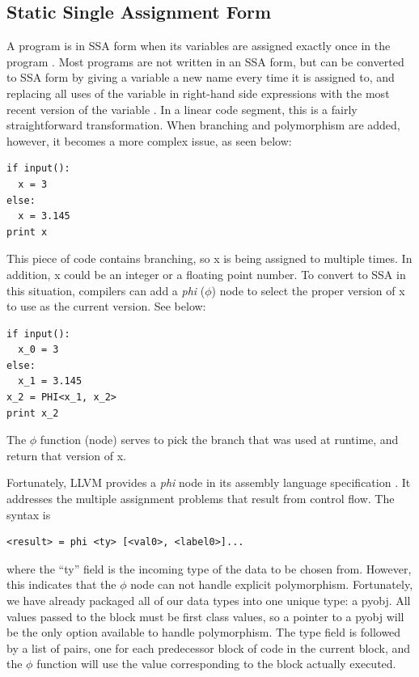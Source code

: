 \documentclass[11pt,twocolumn]{article}
\begin{document}


\subsection{Static Single Assignment Form}
\label{sec:SSAForm}

A program is in SSA form when its variables are assigned exactly once
in the program \cite{gcc-gnu.org}. Most programs are not written in an
SSA form, but can be converted to SSA form by giving a variable a new
name every time it is assigned to, and replacing all uses of the
variable in right-hand side expressions with the most recent version
of the variable \cite{brandis-mossenbock}. In a linear code segment,
this is a fairly straightforward transformation. When branching and
polymorphism are added, however, it becomes a more complex issue, as
seen below:

\begin{verbatim}
if input():
  x = 3
else:
  x = 3.145
print x
\end{verbatim}

This piece of code contains branching, so x is being assigned to
multiple times. In addition, x could be an integer or a floating point
number. To convert to SSA in this situation, compilers can add a
\emph{phi} ($\phi$) node to select the proper version of x to use as
the current version. See below:

\begin{verbatim}
if input():
  x_0 = 3
else:
  x_1 = 3.145
x_2 = PHI<x_1, x_2>
print x_2
\end{verbatim}

The $\phi$ function (node) serves to pick the branch that was used at
runtime, and return that version of x.

Fortunately, LLVM provides a \emph{phi} node in its assembly language
specification \cite{lattner-llvmlangref}. It addresses the multiple
assignment problems that result from control flow. The syntax is

\begin{verbatim}
<result> = phi <ty> [<val0>, <label0>]...
\end{verbatim} 

where the ``ty'' field is the incoming type of the data to be chosen
from. However, this indicates that the $\phi$ node can not handle
explicit polymorphism. Fortunately, we have already packaged all of
our data types into one unique type: a pyobj. All values passed to the
block must be first class values, so a pointer to a pyobj will be the
only option available to handle polymorphism. The type field is
followed by a list of pairs, one for each predecessor block of code in
the current block, and the $\phi$ function will use the value
corresponding to the block actually executed.
\end{document}
